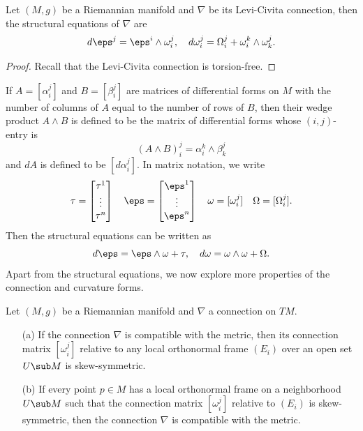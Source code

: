 \begin{corollary}
Let $(M,g)$ be a Riemannian manifold and $\nabla$ be its Levi-Civita connection, then the structural equations of $\nabla$ are
\begin{align}\label{Riemann Levi-Civita sturcture equation}
d\eps^j=\eps^i\wedge\omega_i^j,\quad d\omega_i^j=\Omega_i^j+\omega_i^k\wedge\omega_k^j.
\end{align}
\end{corollary}
\begin{proof}
Recall that the Levi-Civita connection is torsion-free.
\end{proof}
If $A=[\alpha_i^j]$ and $B=[\beta_i^j]$ are matrices of differential forms on $M$ with the number of columns of $A$ equal to the number of rows of $B$, then their wedge 
product $A\wedge B$ is defined to be the matrix of differential forms whose $(i,j)$-entry is
\[(A\wedge B)_i^j=\alpha_i^k\wedge\beta_k^j\]
and $dA$ is defined to be $[d\alpha_i^j]$. In matrix notation, we write
\[\tau=\begin{bmatrix}
\tau^1\\
\vdots\\
\tau^n
\end{bmatrix}\quad \eps=\begin{bmatrix}
\eps^1\\
\vdots\\
\eps^n
\end{bmatrix}\quad \omega=[\omega_i^j]\quad \Omega=[\Omega_i^j].\]
Then the structural equations can be written as
\[d\eps=\eps\wedge\omega+\tau,\quad d\omega=\omega\wedge\omega+\Omega.\]
Apart from the structural equations, we now explore more properties of the connection and curvature forms.
\begin{proposition}
Let $(M,g)$ be a Riemannian manifold and $\nabla$ a connection on $TM$.
\begin{itemize}
\item[(a)] If the connection $\nabla$ is compatible with the metric, then its connection matrix $[\omega_i^j]$ relative to any local orthonormal frame $(E_i)$ over an 
open set $U\sub M$ is skew-symmetric.
\item[(b)] If every point $p\in M$ has a local orthonormal frame on a neighborhood $U\sub M$ such that the connection matrix $[\omega_i^j]$ relative to $(E_i)$ is 
skew-symmetric, then the connection $\nabla$ is compatible with the metric.
\end{itemize}
\end{proposition}
